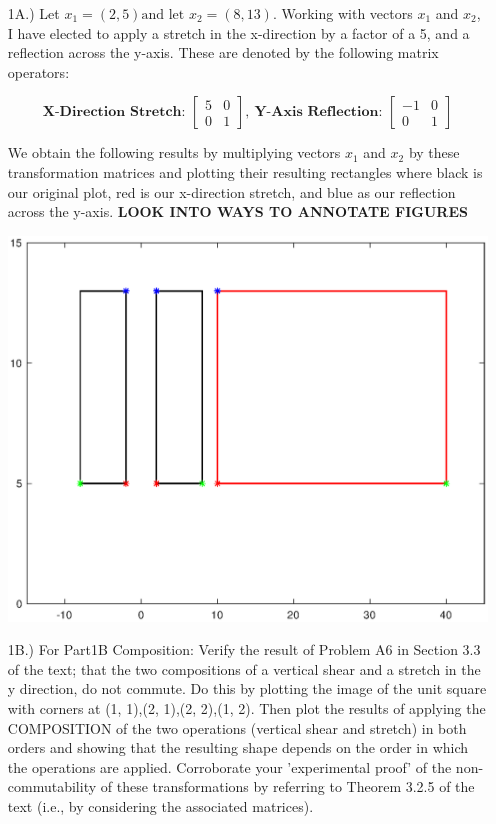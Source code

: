 \documentclass[10pt]{article}
\begin{document}
\noindent{}
\normalsize
\begin{enumerate}[leftmargin=\labelsep]
    \item[1A.)] Let $x_1 = (2, 5) \text{and let } x_2 = (8, 13)$. Working with vectors $x_1$ and $x_2$, I have elected to apply a stretch in the x-direction by a factor of a 5, and a reflection across the y-axis. These are denoted by the following matrix operators: 
    
    $$
    \textbf{X-Direction Stretch: }\begin{bmatrix} 5 & 0 \\ 0 & 1
    \end{bmatrix},\:
    \textbf{Y-Axis Reflection: }\begin{bmatrix} -1 & 0 \\ 0 & 1
    \end{bmatrix}
    $$
    
    We obtain the following results by multiplying vectors $x_1$ and $x_2$ by these transformation matrices and plotting their resulting rectangles where black is our original plot, red is our x-direction stretch, and blue as our reflection across the y-axis. \textbf{LOOK INTO WAYS TO ANNOTATE FIGURES}
    
    \begin{center}
        \includegraphics[scale=0.5]{Figure1.eps}
    \end{center}
    
    \item[1B.)] For Part1B Composition: Verify the result of Problem A6 in Section 3.3 of the text; that the two compositions of a vertical shear and a stretch in the y direction, do not commute. Do this by plotting the image of the unit square with corners at (1, 1),(2, 1),(2, 2),(1, 2). Then plot the results of applying the COMPOSITION of the two operations (vertical shear and stretch) in both orders and showing that the resulting shape depends on the order in which the operations are applied. Corroborate your ’experimental proof’ of the non-commutability of these transformations by referring to Theorem 3.2.5 of the text (i.e., by considering the associated matrices).
    

\end{enumerate}
\end{document}

